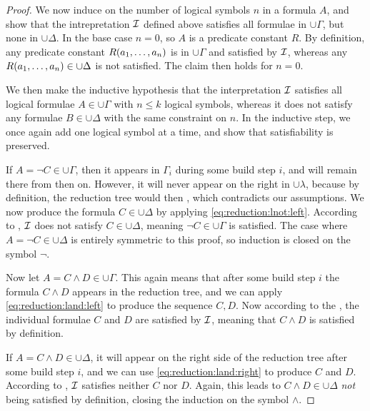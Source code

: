 \documentclass[11pt,a4paper]{article}
\begin{document}
\begin{proof}
    We now induce on the number of logical symbols \(n\) in a formula \(A\),
    and show that the intrepretation \(\mathcal{I}\) defined above
    satisfies all formulae in \(\cup\Gamma\),
    but none in \(\cup\Delta\). In the base case \(n=0\),
    so \(A\) is a predicate constant \(R\). By definition,
    any predicate constant \(R(a_1,\ldots,a_n)\) is
    in \(\cup\Gamma\) and satisfied by \(\mathcal{I}\),
    whereas any \(R(a_1,\ldots,a_n)\in\cup\Delta\)
    is not satisfied. The claim then holds for \(n=0\).

    We then make the inductive hypothesis \IH{} that the interpretation
    \(\mathcal{I}\) satisfies all logical formulae \(A\in\cup\Gamma\) with \(n\leq k\)
    logical symbols, whereas it does not satisfy any formulae \(B\in\cup\Delta\)
    with the same constraint on \(n\). In the inductive step,
    we once again add one logical symbol at a time, and show
    that satisfiability is preserved.

    If \(A = \lnot C\in\cup\Gamma\), then it appears in \(\Gamma_i\)
    during some build step \(i\), and will remain there from then on.
    However, it will never appear on the right in \(\cup\lambda\),
    because by definition, the reduction tree would then \halt{},
    which contradicts our assumptions.
    We now produce the formula \(C\in\cup\Delta\)
    by applying \eqref{eq:reduction:lnot:left}.
    According to \IH{}, \(\mathcal{I}\) does not satisfy \(C\in\cup\Delta\),
    meaning \(\lnot C\in\cup\Gamma\) is satisfied.
    The case where \(A = \lnot C\in\cup\Delta\)
    is entirely symmetric to this proof, so induction is closed
    on the symbol \(\lnot\).

    Now let \(A = C\land D\in\cup\Gamma\). This again means that
    after some build step \(i\) the formula \(C\land D\) appears
    in the reduction tree, and we can apply \eqref{eq:reduction:land:left}
    to produce the sequence \(C,D\).
    Now according to the \IH{}, the individual formulae \(C\)
    and \(D\) are satisfied by \(\mathcal{I}\), meaning that
    \(C\land D\) is satisfied by definition.

    If \(A = C\land D\in\cup\Delta\), it will appear on the right
    side of the reduction tree after some build step \(i\),
    and we can use \eqref{eq:reduction:land:right} to produce \(C\) and \(D\).
    According to \IH{}, \(\mathcal{I}\) satisfies neither \(C\) nor \(D\).
    Again, this leads to \(C\land D\in\cup\Delta\) \emph{not} being satisfied
    by definition, closing the induction on the symbol \(\land\).


\end{proof}
\end{document}
